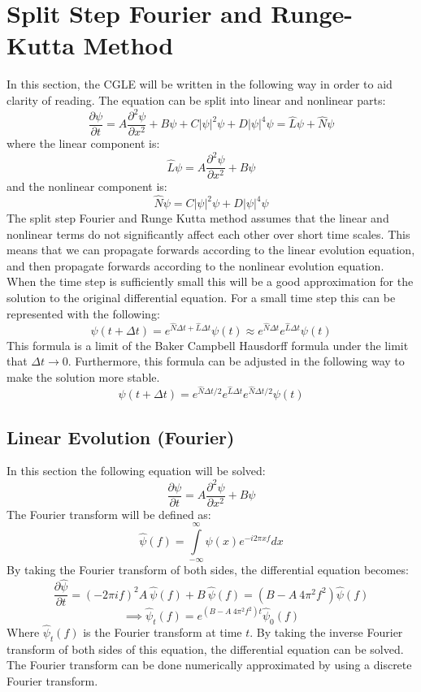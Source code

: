 \documentclass[a4paper,12pt]{report}
\begin{document}
\section{Split Step Fourier and Runge-Kutta Method}
In this section, the CGLE will be written in the following way in order to aid clarity of reading. The equation can be split into linear and nonlinear parts:
$$\frac{\partial\psi}{\partial t} = A \frac{\partial^2\psi}{\partial x^2} + B\psi + C |\psi|^2\psi + D|\psi|^4\psi = \hat L \psi + \hat N \psi$$
where the linear component is:
$$\hat L \psi = A \frac{\partial^2\psi}{\partial x^2} + B\psi$$
and the nonlinear component is:
$$\hat N \psi = C |\psi|^2\psi + D|\psi|^4\psi$$
The split step Fourier and Runge Kutta method assumes that the linear and nonlinear terms do not significantly affect each other over short time scales.\cite{taha} This means that we can propagate forwards according to the linear evolution equation, and then propagate forwards according to the nonlinear evolution equation. When the time step is sufficiently small this will be a good approximation for the solution to the original differential equation. For a small time step this can be represented with the following:
$$\psi(t+\Delta t)=e^{\hat N\Delta t+\hat L\Delta t}\psi(t)\approx e^{\hat N\Delta t}e^{\hat L\Delta t}\psi(t)$$ 
This formula is a limit of the Baker Campbell Hausdorff formula under the limit that $\Delta t\rightarrow 0$.
Furthermore, this formula can be adjusted in the following way to make the solution more stable. \cite{bch}
$$\psi(t+\Delta t)=e^{\hat N\Delta t/2}e^{\hat L\Delta t}e^{\hat N\Delta t/2}\psi(t)$$ 





\subsection{Linear Evolution (Fourier) \cite{taha}}
In this section the following equation will be solved:
$$\frac{\partial\psi}{\partial t}=A\frac{\partial^2\psi}{\partial x^2}+B\psi$$
The Fourier transform will be defined as: 
$$\hat \psi(f)=\int\limits_{-\infty}^\infty \psi(x)e^{-i2\pi x f} dx$$
By taking the Fourier transform of both sides, the differential equation becomes:\\
$$\frac{\partial \hat \psi}{\partial t}= (-2\pi i f)^2 A \ \hat \psi (f)+B\ \hat \psi(f)= (B-A \ 4 \pi^2 f^2) \hat \psi(f)$$
$$\implies \hat \psi_t(f) = e^{(B-A \ 4\pi^2 f^2)t}\hat \psi_0(f)$$
Where $\hat \psi_t(f)$ is the Fourier transform at time $t$.
By taking the inverse Fourier transform of both sides of this equation, the differential equation can be solved. 
The Fourier transform can be done numerically approximated by using a discrete Fourier transform.
\end{document}
